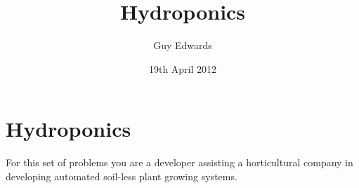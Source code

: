 \documentclass[11pt]{book}
\author{Guy Edwards}
\date{19th April 2012}
\title{Hydroponics}
\begin{document}

\chapter{Hydroponics}

For this set of problems you are a developer assisting a horticultural company
in developing automated soil-less plant growing systems.

\clearpage
\end{document}

